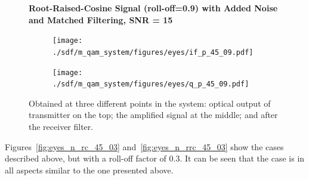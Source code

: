 \begin{figure}[H]
	\centering
\textbf{Root-Raised-Cosine Signal (roll-off=0.9) with Added Noise and Matched Filtering, SNR = 15}
\begin{minipage}{\linewidth}
	\centering
	\begin{subfigure}{.45\textwidth}
		\centering
		\texttt{[image: ./sdf/m\_qam\_system/figures/eyes/if\_p\_45\_09.pdf]}
	\end{subfigure}
	\begin{subfigure}{.45\textwidth}
		\centering
		\texttt{[image: ./sdf/m\_qam\_system/figures/eyes/q\_p\_45\_09.pdf]}
	\end{subfigure}
	
	\caption{
		Obtained at three different points in the system: optical output of transmitter on the top;
		the amplified signal at the middle; and
		after the receiver filter.
		\label{fig:eyes_n_rrc_45_09}}
	\end{minipage}
\end{figure}


Figures~\ref{fig:eyes_n_rc_45_03} and~\ref{fig:eyes_n_rrc_45_03} show the
cases described above, but with a roll-off factor of 0.3. It can be seen that
the case is in all aspects similar to the one presented above.

